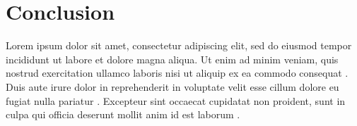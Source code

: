 \chapter{Conclusion}
\label{chap:conclusion}

Lorem ipsum dolor sit amet, consectetur adipiscing elit, sed do eiusmod tempor incididunt ut labore et dolore magna aliqua. Ut enim ad minim veniam, quis nostrud exercitation ullamco laboris nisi ut aliquip ex ea commodo consequat \textcite{ref1}. Duis aute irure dolor in reprehenderit in voluptate velit esse cillum dolore eu fugiat nulla pariatur \textcite{ref2}. Excepteur sint occaecat cupidatat non proident, sunt in culpa qui officia deserunt mollit anim id est laborum \textcite{ref3}.
